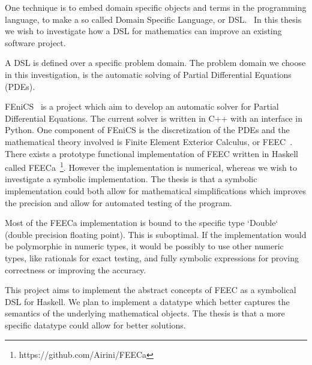 \documentclass{scrartcl}
\begin{document}
One technique is to embed domain specific objects and terms in the programming
language, to make a so called Domain Specific Language, or DSL.~\cite{van2000domain}
In this thesis we wish to investigate how a DSL
for mathematics can improve an existing software project.

A DSL is defined over a specific problem domain. The problem domain we choose
in this investigation, is the automatic solving of Partial Differential
Equations (PDEs).

FEniCS~\cite{AlnaesBlechta2015a} is a project which aim to develop an
automatic solver for Partial Differential Equations. The current
solver is written in C++ with an interface in Python. One component of
FEniCS is the discretization of the PDEs and the mathematical theory
involved is Finite Element Exterior Calculus, or
FEEC~\cite{arnold2006finite}. There exists a prototype functional
implementation of FEEC written in Haskell called
FEECa~\footnote{https://github.com/Airini/FEECa}.  However the
implementation is numerical, whereas we wish to investigate a symbolic
implementation.  The thesis is that a symbolic implementation could
both allow for mathematical simplifications which improves the
precision and allow for automated testing of the program.


Most of the FEECa implementation is bound to the specific type
`Double` (double precision floating point). This is suboptimal. If the
implementation would be polymorphic in numeric types, it would be
possibly to use other numeric types, like rationals for exact testing,
and fully symbolic expressions for proving correctness or improving
the accuracy.


This project aims to implement the abstract concepts of FEEC as a symbolical
DSL for Haskell.  %
We plan to implement a datatype which better captures the semantics of the
underlying mathematical objects.  The thesis is that a more specific datatype
could allow for better solutions.

\end{document}
